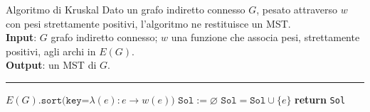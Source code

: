 \documentclass[a4paper, 12pt]{report}
\begin{document}
    \begin{framedalgo}{Algoritmo di Kruskal}
        Dato un grafo indiretto connesso $G$, pesato attraverso $w$ con pesi strettamente positivi, l'algoritmo ne restituisce un MST.\\
        \textbf{Input}: $G$ grafo indiretto connesso; $w$ una funzione che associa pesi, strettamente positivi, agli archi in $E(G)$.\\
        \textbf{Output}: un MST di $G$.

        \hrule
        \begin{algorithmic}[1]
                \State $E(G)\texttt{.sort(key=}\lambda (e): e \rightarrow w(e)\texttt{)}$ 
                \State $\texttt{Sol}:= \varnothing$
                 
                        \State $\texttt{Sol} = \texttt{Sol} \cup \{e\}$
                    \EndIf
                \EndFor
                \State \textbf{return} \texttt{Sol}
            \EndFunction
        \end{algorithmic}
    \end{framedalgo}
\end{document}
